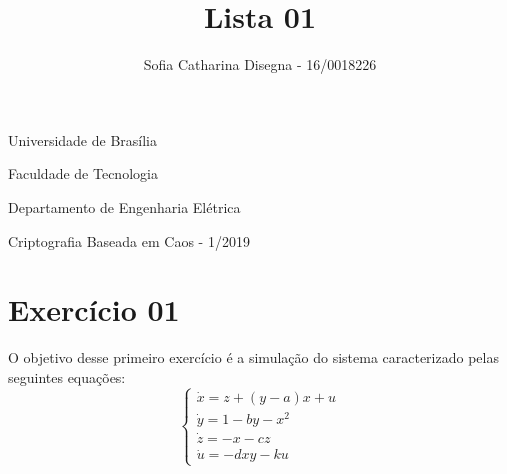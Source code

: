 \documentclass[12pt]{article}
\author{Sofia Catharina Disegna - 16/0018226}
\date{}
\title{Lista 01}
\begin{document}
\tiny
Universidade de Brasília

Faculdade de Tecnologia

Departamento de Engenharia Elétrica

Criptografia Baseada em Caos - 1/2019

\normalsize

{\let\newpage\relax\maketitle}
\section{Exercício 01}
    O objetivo desse primeiro exercício é a simulação do sistema caracterizado pelas seguintes equações:
    \begin{equation}
        \left\{
            \begin{array}{l}
              \dot{x} = z + (y - a)x + u\\
              \dot{y} = 1 - by - x^2\\
              \dot{z} = -x - cz\\
              \dot{u} = -dxy - ku
            \end{array}
          \right.
    \end{equation}
\end{document}
